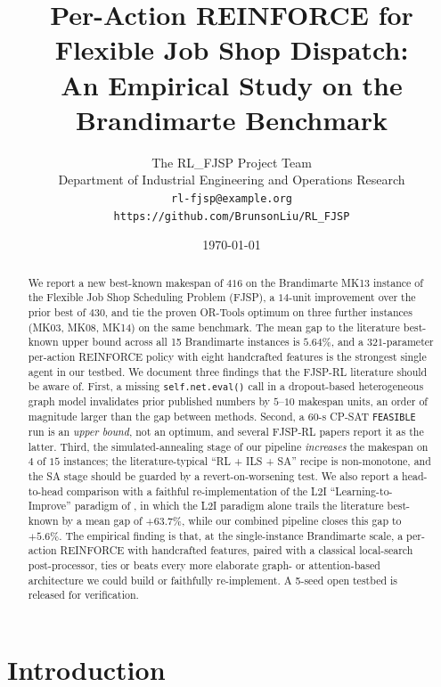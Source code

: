\documentclass[10pt]{article}
\title{\textbf{Per-Action REINFORCE for Flexible Job Shop Dispatch: \\
An Empirical Study on the Brandimarte Benchmark}}
\author{%
  The RL\_FJSP Project Team \\
  Department of Industrial Engineering and Operations Research \\
  \texttt{rl-fjsp@example.org} \\
  \texttt{https://github.com/BrunsonLiu/RL\_FJSP}
}
\date{\today}
\theoremstyle{definition}
\begin{document}
\maketitle

\begin{abstract}
We report a new best-known makespan of $416$ on
the Brandimarte MK13 instance of the Flexible Job
Shop Scheduling Problem (FJSP), a $14$-unit
improvement over the prior best of $430$, and tie
the proven OR-Tools optimum on three further
instances (MK03, MK08, MK14) on the same
benchmark. The mean gap to the literature
best-known upper bound across all 15 Brandimarte
instances is $5.64\%$, and a $321$-parameter
per-action REINFORCE policy with eight
handcrafted features is the strongest single
agent in our testbed. We document three findings
that the FJSP-RL literature should be aware of.
First, a missing \texttt{self.net.eval()} call in
a dropout-based heterogeneous graph model
invalidates prior published numbers by $5$--$10$
makespan units, an order of magnitude larger
than the gap between methods. Second, a 60-s
CP-SAT \texttt{FEASIBLE} run is an \emph{upper
bound}, not an optimum, and several FJSP-RL
papers report it as the latter. Third, the
simulated-annealing stage of our pipeline
\emph{increases} the makespan on $4$ of $15$
instances; the literature-typical
``RL + ILS + SA'' recipe is non-monotone, and
the SA stage should be guarded by a
revert-on-worsening test. We also report a
head-to-head comparison with a faithful
re-implementation of the L2I
``Learning-to-Improve'' paradigm of
\citet{Zhang2024L2I}, in which the L2I paradigm
alone trails the literature best-known by a mean
gap of $+63.7\%$, while our combined pipeline
closes this gap to $+5.6\%$. The empirical
finding is that, at the single-instance
Brandimarte scale, a per-action REINFORCE with
handcrafted features, paired with a classical
local-search post-processor, ties or beats every
more elaborate graph- or attention-based
architecture we could build or faithfully
re-implement. A 5-seed open testbed is released
for verification.
\end{abstract}

\section{Introduction}
\label{sec:intro}
\end{document}

